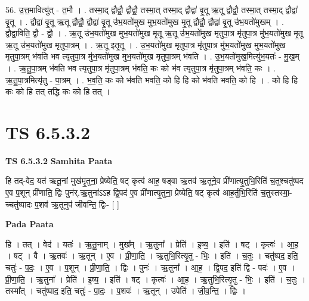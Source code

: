 \documentclass[17pt]{extarticle}
\begin{document}
56. उ॒त्त॒मावित्यु॑त् - त॒मौ । . तस्मा॒द् द्वौद्वौ॒ द्वौद्वौ॒ तस्मा॒त् तस्मा॒द् द्वौद्वा॑ वृ॒तू ऋ॒तू द्वौद्वौ॒ तस्मा॒त् तस्मा॒द् द्वौद्वा॑ वृ॒तू । . द्वौद्वा॑ वृ॒तू ऋ॒तू द्वौद्वौ॒ द्वौद्वा॑ वृ॒तू उ॑भ॒यतो॑मुख मुभ॒यतो॑मुख मृ॒तू द्वौद्वौ॒ द्वौद्वा॑ वृ॒तू उ॑भ॒यतो॑मुखम् । . द्वौद्वा॒विति॒ द्वौ - द्वौ॒ । . ऋ॒तू उ॑भ॒यतो॑मुख मुभ॒यतो॑मुख मृ॒तू ऋ॒तू उ॑भ॒यतो॑मुख मृतुपा॒त्र मृ॑तुपा॒त्र मु॑भ॒यतो॑मुख मृ॒तू ऋ॒तू उ॑भ॒यतो॑मुख मृतुपा॒त्रम् । . ऋ॒तू इतृ॒तू । . उ॒भ॒यतो॑मुख मृतुपा॒त्र मृ॑तुपा॒त्र मु॑भ॒यतो॑मुख मुभ॒यतो॑मुख मृतुपा॒त्रम् भ॑वति भव त्यृतुपा॒त्र मु॑भ॒यतो॑मुख मुभ॒यतो॑मुख मृतुपा॒त्रम् भ॑वति । . उ॒भ॒यतो॑मुख॒मित्यु॑भ॒यतः॑ - मु॒ख॒म् । . ऋ॒तु॒पा॒त्रम् भ॑वति भव त्यृतुपा॒त्र मृ॑तुपा॒त्रम् भ॑वति॒ कः को भ॑व त्यृतुपा॒त्र मृ॑तुपा॒त्रम् भ॑वति॒ कः । . ऋ॒तु॒पा॒त्रमित्यृ॑तु - पा॒त्रम् । . भ॒व॒ति॒ कः को भ॑वति भवति॒ को हि हि को भ॑वति भवति॒ को हि । . को हि हि कः को हि तत् तद्धि कः को हि तत् । \newline
\pagebreak
{}

\section{ TS 6.5.3.2 }

\textbf{TS 6.5.3.2 } \newline
\textbf{Samhita Paata} \newline

हि तद्-वेद॒ यत॑ ऋतू॒नां मुख॑मृ॒तुना॒ प्रेष्येति॒ षट् कृत्व॑ आह॒ षड्वा ऋ॒तव॑ ऋ॒तूने॒व प्री॑णात्यृ॒तुभि॒रिति॑ च॒तुश्चतु॑ष्पद ए॒व प॒शून् प्री॑णाति॒ द्विः पुन॑र्.ऋ॒तुना॑ऽऽह द्वि॒पद॑ ए॒व प्री॑णात्यृ॒तुना॒ प्रेष्येति॒ षट् कृत्व॑ आह॒र्तुभि॒रिति॑ च॒तुस्तस्मा॒-च्चतु॑ष्पादः प॒शव॑ ऋ॒तूनुप॑ जीवन्ति॒ द्विः- [  ] \newline

\textbf{Pada Paata} \newline

हि । तत् । वेद॑ । यतः॑ । ऋ॒तू॒नाम् । मुख᳚म् । ऋ॒तुना᳚ । प्रेति॑ । इ॒ष्य॒ । इति॑ । षट् । कृत्वः॑ । आ॒ह॒ । षट् । वै । ऋ॒तवः॑ । ऋ॒तून् । ए॒व । प्री॒णा॒ति॒ । ऋ॒तुभि॒रित्यृ॒तु - भिः॒ । इति॑ । च॒तुः । चतु॑ष्पद॒ इति॒ चतुः॑ - प॒दः॒ । ए॒व । प॒शून् । प्री॒णा॒ति॒ । द्विः । पुनः॑ । ऋ॒तुना᳚ । आ॒ह॒ । द्वि॒पद॒ इति॑ द्वि - पदः॑ । ए॒व । प्री॒णा॒ति॒ । ऋ॒तुना᳚ । प्रेति॑ । इ॒ष्य॒ । इति॑ । षट् । कृत्वः॑ । आ॒ह॒ । ऋ॒तुभि॒रित्यृ॒तु - भिः॒ । इति॑ । च॒तुः । तस्मा᳚त् । चतु॑ष्पाद॒ इति॒ चतुः॑ - पा॒दः॒ । प॒शवः॑ । ऋ॒तून् । उपेति॑ । जी॒व॒न्ति॒ । द्विः ।  \newline
\end{document}
